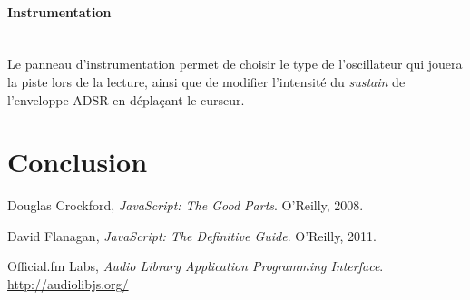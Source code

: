 \documentclass[12pt,a4paper]{article}
\begin{document}
\paragraph{Instrumentation}~\\
Le panneau d’instrumentation permet de choisir le type de l'oscillateur qui jouera la piste lors de la lecture, ainsi que de modifier l'intensité du \emph{sustain} de l'enveloppe ADSR en déplaçant le curseur.


\section{Conclusion}

\pagebreak

\begin{thebibliography}{99}

	Douglas Crockford,
	\emph{JavaScript: The Good Parts}.
	O'Reilly, 2008.

\medskip

	David Flanagan,
	\emph{JavaScript: The Definitive Guide}.
	O'Reilly, 2011.

\medskip

	Official.fm Labs,
	\emph{Audio Library Application Programming Interface}.\\
	\url{http://audiolibjs.org/}

\end{thebibliography}

\appendix
\end{document}
